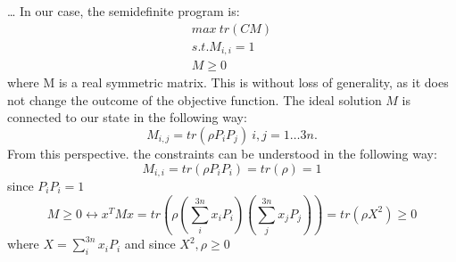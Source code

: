 \ldots
In our case, the semidefinite program is:
\begin{align*}
max ~ tr\left( CM \right)\\
s.t. M_{i,i} = 1 \\
M \ge 0
\end{align*}
where M is a real symmetric matrix.
This is without loss of generality, as it does not change the outcome of the objective function. 
The ideal solution $M$ is connected to our state in the following way:\cite{gharibian19}
\[
	M_{i,j} = tr\left( \rho P_{i}P_j \right) ~ i,j=1\ldots 3n
.\]
From this perspective. the constraints can be understood in the following way:
$$M_{i,i}=tr\left( \rho P_i P_i\right) = tr\left( \rho\right) = 1  $$ since $P_iP_i=1$
$$M\ge 0\leftrightarrow x^TMx=tr\left(\rho\left(\sum_{i}^{3n} x_iP_i\right)\left(\sum_{j}^{3n} x_jP_j\right)\right)=tr\left(\rho X^2\right)\ge 0$$ where $X=\sum_{i}^{3n} x_iP_i$ and since $X^2,\rho\ge 0$
